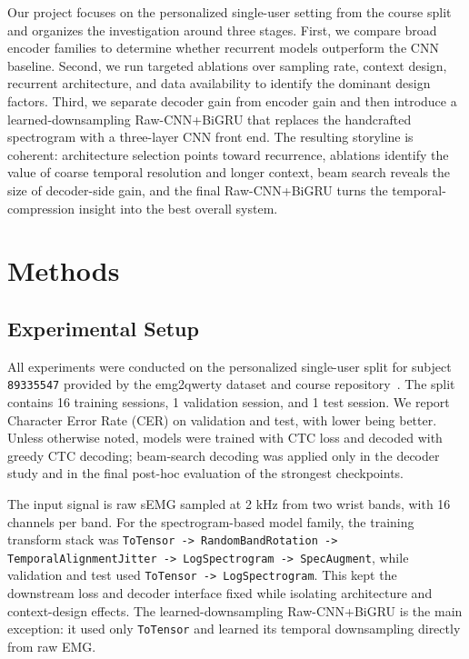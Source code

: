 Our project focuses on the personalized single-user setting from the course split and organizes the investigation around three stages. First, we compare broad encoder families to determine whether recurrent models outperform the CNN baseline. Second, we run targeted ablations over sampling rate, context design, recurrent architecture, and data availability to identify the dominant design factors. Third, we separate decoder gain from encoder gain and then introduce a learned-downsampling Raw-CNN+BiGRU that replaces the handcrafted spectrogram with a three-layer CNN front end. The resulting storyline is coherent: architecture selection points toward recurrence, ablations identify the value of coarse temporal resolution and longer context, beam search reveals the size of decoder-side gain, and the final Raw-CNN+BiGRU turns the temporal-compression insight into the best overall system.

\section{Methods}

\subsection{Experimental Setup}

All experiments were conducted on the personalized single-user split for subject \texttt{89335547} provided by the emg2qwerty dataset and course repository~\cite{sivakumar2024emg2qwerty}. The split contains 16 training sessions, 1 validation session, and 1 test session. We report Character Error Rate (CER) on validation and test, with lower being better. Unless otherwise noted, models were trained with CTC loss and decoded with greedy CTC decoding; beam-search decoding was applied only in the decoder study and in the final post-hoc evaluation of the strongest checkpoints.

The input signal is raw sEMG sampled at 2 kHz from two wrist bands, with 16 channels per band. For the spectrogram-based model family, the training transform stack was \texttt{ToTensor -> RandomBandRotation -> TemporalAlignmentJitter -> LogSpectrogram -> SpecAugment}, while validation and test used \texttt{ToTensor -> LogSpectrogram}. This kept the downstream loss and decoder interface fixed while isolating architecture and context-design effects. The learned-downsampling Raw-CNN+BiGRU is the main exception: it used only \texttt{ToTensor} and learned its temporal downsampling directly from raw EMG.


